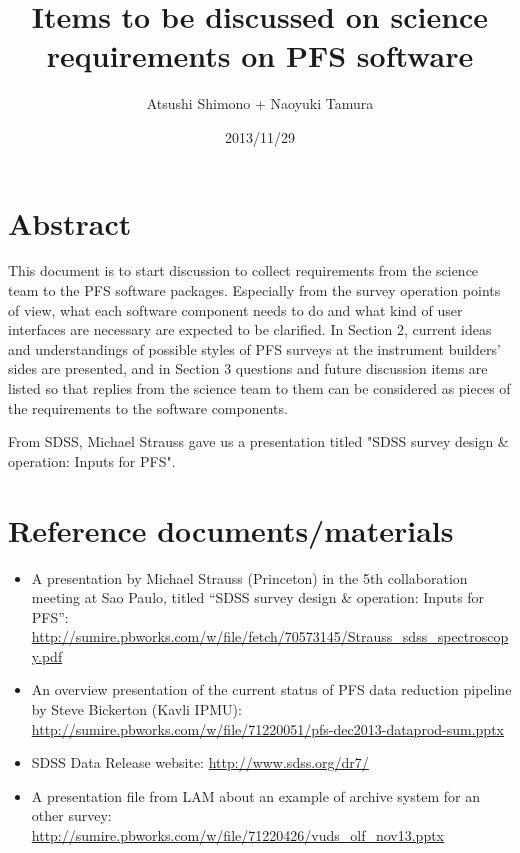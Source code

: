 \documentclass[a4paper,notitlepage]{article}
\title{Items to be discussed on science requirements on PFS software}
\author{Atsushi Shimono + Naoyuki Tamura}
\date{2013/11/29}
\begin{document}

\ssnhead

\section{Abstract}

This document is to start discussion to collect requirements from the
science team to the PFS software packages. Especially from the survey
operation points of view, what each software component needs to do and
what kind of user interfaces are necessary are expected to be
clarified. In Section 2, current ideas and understandings of possible
styles of PFS surveys at the instrument builders' sides are presented,
and in Section 3 questions and future discussion items are listed so
that replies from the science team to them can be considered as pieces
of the requirements to the software components.

From SDSS, Michael Strauss gave us a presentation titled "SDSS survey
design \& operation: Inputs for PFS".

\section{Reference documents/materials}
\label{sec:ref}

\begin{itemize}
 
 \item A presentation by Michael Strauss (Princeton) in the 5th
       collaboration meeting at Sao Paulo, titled ``SDSS survey
       design \& operation: Inputs for PFS'':
       \url{http://sumire.pbworks.com/w/file/fetch/70573145/Strauss_sdss_spectroscopy.pdf}
 \item An overview presentation of the current status of PFS data
       reduction pipeline by Steve Bickerton (Kavli IPMU): 
       \url{http://sumire.pbworks.com/w/file/71220051/pfs-dec2013-dataprod-sum.pptx}
 \item SDSS Data Release website: \url{http://www.sdss.org/dr7/}
 \item A presentation file from LAM about an example of archive system
       for an other survey: 
       \url{http://sumire.pbworks.com/w/file/71220426/vuds_olf_nov13.pptx}
\end{itemize}
\end{document}

